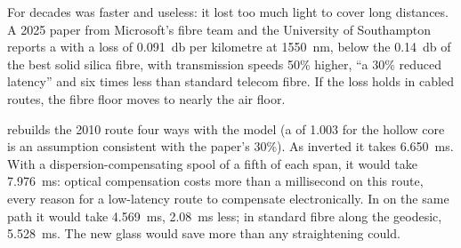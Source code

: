 For decades  was faster and useless: it lost too much light to cover long distances. A 2025 paper from Microsoft's fibre team
and the University of Southampton reports a  with a loss of \qty{0.091}{\decibel} per kilometre at \qty{1550}{\nano\metre},
below the \qty{0.14}{\decibel} of the best solid silica fibre, with transmission speeds 50\% higher, ``a 30\% reduced latency'' and six times
less  than standard telecom fibre. If the loss holds in cabled routes, the fibre floor moves to nearly the air floor.

 rebuilds the 2010 route four ways with the model (a  of 1.003 for the hollow core is an
assumption consistent with the paper's 30\%). As inverted it takes \qty{6.650}{\milli\second}. With a dispersion-compensating spool of a fifth of
each span, it would take \qty{7.976}{\milli\second}: optical compensation costs more than a millisecond on this route, every reason for a low-latency
route to compensate electronically. In  on the same path it would take \qty{4.569}{\milli\second}, \qty{2.08}{\milli\second}
less; in standard fibre along the geodesic, \qty{5.528}{\milli\second}. The new glass would save more than any straightening could.

